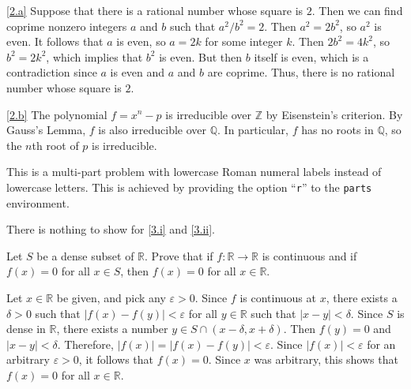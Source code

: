 \documentclass{homework}
\begin{document}
\begin{solution}
\ref{2.a}
Suppose that there is a rational number whose square is $2$.
Then we can find coprime nonzero integers $a$ and $b$ such that $a^2 / b^2 = 2$.
Then $a^2 = 2 b^2$, so $a^2$ is even.
It follows that $a$ is even, so $a = 2 k$ for some integer $k$.
Then $2 b^2 = 4 k^2$, so $b^2 = 2 k^2$, which implies that $b^2$ is even.
But then $b$ itself is even, which is a contradiction since $a$ is even and $a$
and $b$ are coprime.
Thus, there is no rational number whose square is $2$.

\ref{2.b}
The polynomial $f = x^n - p$ is irreducible over $\mathbb{Z}$ by Eisenstein's
criterion.
By Gauss's Lemma, $f$ is also irreducible over $\mathbb{Q}$.
In particular, $f$ has no roots in $\mathbb Q$, so the $n$th root of $p$ is
irreducible.
\end{solution}

\begin{problem}
This is a multi-part problem with lowercase Roman numeral labels instead
of lowercase letters.
This is achieved by providing the option ``\texttt{r}'' to the \texttt{parts}
environment.
\end{problem}

\begin{solution}
There is nothing to show for \ref{3.i} and \ref{3.ii}.
\end{solution}

\begin{problem}
Let $S$ be a dense subset of $\mathbb R$.
Prove that if $f : \mathbb R \to \mathbb R$ is continuous and if $f(x) = 0$ for
all $x \in S$, then $f(x) = 0$ for all $x \in \mathbb R$.
\end{problem}

\begin{solution}
Let $x \in \mathbb R$ be given, and pick any $\varepsilon > 0$.
Since $f$ is continuous at $x$, there exists a $\delta > 0$ such that
$|f(x) - f(y)| < \varepsilon$ for all $y \in \mathbb R$ such that
$|x - y| < \delta$.
Since $S$ is dense in $\mathbb R$, there exists a number
$y \in S \cap (x - \delta, x + \delta)$.
Then $f(y) = 0$ and $|x - y| < \delta$.
Therefore, $|f(x)| = |f(x) - f(y)| < \varepsilon$.
Since $|f(x)| < \varepsilon$ for an arbitrary $\varepsilon > 0$, it follows that
$f(x) = 0$.
Since $x$ was arbitrary, this shows that $f(x) = 0$ for all $x \in \mathbb R$.
\end{solution}
\end{document}
